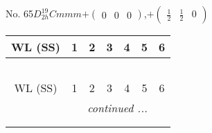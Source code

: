 \documentclass[fleqn,9pt,landscape]{jsarticle}
\begin{document}
\newpage
No. 65\quad$D_{2h}^{19}$\quad$Cmmm$\quad[ orthorhombic ]\quad$+\begin{pmatrix} 0 & 0 & 0 \end{pmatrix}$,\quad $+\begin{pmatrix} \frac{1}{2} & \frac{1}{2} & 0 \end{pmatrix}$
\begin{center}
\renewcommand{\arraystretch}{1.2}
\begin{longtable}{ccccccc}
 \hline \hline
WL (SS) & 1 & 2 & 3 & 4 & 5 & 6 \\ \hline \endfirsthead

\multicolumn{6}{l}{\tablename\ \thetable{}} \\
 \hline \hline
WL (SS) & 1 & 2 & 3 & 4 & 5 & 6 \\ \hline \endhead

 \hline \hline
\multicolumn{6}{r}{\footnotesize\it continued ...} \\ \endfoot

 \hline \hline
\multicolumn{6}{r}{} \\ \endlastfoot


\end{longtable}
\end{center}
\end{document}
